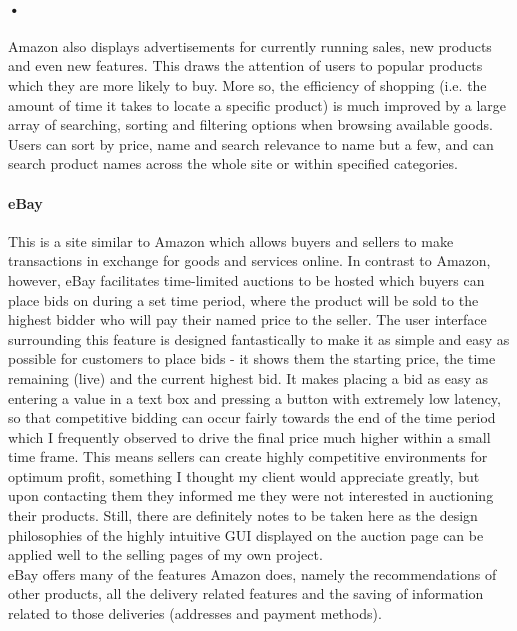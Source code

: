 \documentclass{article}
\begin{document}
    \paragraph{•}
    Amazon also displays advertisements for currently running sales, new products and even new features.
    This draws the attention of users to popular products which they are more likely to buy.
    More so, the efficiency of shopping (i.e. the amount of time it takes to locate a specific product) is much improved by a large array of searching, sorting and filtering options when browsing available goods.
    Users can sort by price, name and search relevance to name but a few, and can search product names across the whole site or within specified categories.
    
    \paragraph{eBay}
    This is a site similar to Amazon which allows buyers and sellers to make transactions in exchange for goods and services online.
    In contrast to Amazon, however, eBay facilitates time-limited auctions to be hosted which buyers can place bids on during a set time period, where the product will be sold to the highest bidder who will pay their named price to the seller.
    The user interface surrounding this feature is designed fantastically to make it as simple and easy as possible for customers to place bids - it shows them the starting price, the time remaining (live) and the current highest bid.
    It makes placing a bid as easy as entering a value in a text box and pressing a button with extremely low latency, so that competitive bidding can occur fairly towards the end of the time period which I frequently observed to drive the final price much higher within a small time frame.
    This means sellers can create highly competitive environments for optimum profit, something I thought my client would appreciate greatly, but upon contacting them they informed me they were not interested in auctioning their products.
    Still, there are definitely notes to be taken here as the design philosophies of the highly intuitive GUI displayed on the auction page can be applied well to the selling pages of my own project.
    \\
    eBay offers many of the features Amazon does, namely the recommendations of other products, all the delivery related features and the saving of information related to those deliveries (addresses and payment methods).
\end{document}
